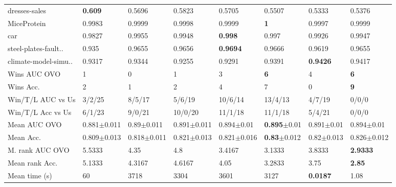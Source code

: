 \begin{tabular}{llllllll}
dresses-sales        &   \textbf{0.609} &           0.5696 &           0.5823 &           0.5705 &                   0.5507 &           0.5333 &           0.5376 \\
MiceProtein          &           0.9983 &           0.9999 &           0.9998 &           0.9999 &               \textbf{1} &           0.9997 &           0.9999 \\
car                  &           0.9827 &           0.9955 &           0.9948 &   \textbf{0.998} &                    0.997 &           0.9926 &           0.9947 \\
steel-plates-fault.. &            0.935 &           0.9655 &           0.9656 &  \textbf{0.9694} &                   0.9666 &           0.9619 &           0.9655 \\
climate-model-simu.. &           0.9317 &           0.9344 &           0.9255 &           0.9291 &                   0.9391 &  \textbf{0.9426} &           0.9417 \\
\midrule
Wins AUC OVO
                                         &                1 &                0 &                1 &                3 &               \textbf{6} &                4 &       \textbf{6} \\
Wins Acc.            &                2 &                1 &                2 &                4 &                        7 &                0 &       \textbf{9} \\
\midrule
Win/T/L AUC
                             vs Us    &           3/2/25 &           8/5/17 &           5/6/19 &          10/6/14 &                  13/4/13 &           4/7/19 &            0/0/0 \\
Win/T/L Acc vs Us    &           6/1/23 &           9/0/21 &          10/0/20 &          11/1/18 &                  11/1/18 &           5/4/21 &            0/0/0 \\
\midrule
Mean AUC OVO
                                         &  0.881$\pm$0.011 &   0.89$\pm$0.011 &  0.891$\pm$0.011 &   0.894$\pm$0.01 &  \textbf{0.895}$\pm$0.01 &   0.891$\pm$0.01 &   0.894$\pm$0.01 \\
Mean Acc.            &  0.809$\pm$0.013 &  0.818$\pm$0.011 &  0.821$\pm$0.013 &  0.821$\pm$0.016 &  \textbf{0.83}$\pm$0.012 &   0.82$\pm$0.013 &  0.826$\pm$0.012 \\
\midrule
M. rank AUC OVO
                                      &           5.5333 &             4.35 &              4.8 &           3.4167 &                   3.1333 &           3.8333 &  \textbf{2.9333} \\
Mean rank Acc.       &           5.1333 &           4.3167 &           4.6167 &             4.05 &                   3.2833 &             3.75 &    \textbf{2.85} \\
\midrule
Mean time (s) 
                                    &               60 &             3718 &             3304 &             3601 &                     3127 &  \textbf{0.0187} &             1.08 \\
\bottomrule
\end{tabular}
